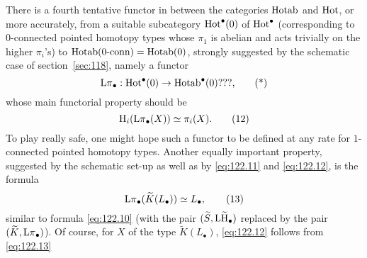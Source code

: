 There is a fourth tentative functor in between the categories
$\operatorname{Hotab}$ and $\operatorname{Hot}$, or more accurately, from a suitable
subcategory $\operatorname{Hot}^\bullet(0)$ of $\operatorname{Hot}^\bullet$ (corresponding to
$0$-connected pointed homotopy types whose $\pi_1$ is abelian and acts
trivially on the higher $\pi_i$'s) to $\operatorname{Hotab}(0\textup{-}\mathrm{conn})=\operatorname{Hotab}(0)$,
strongly suggested by the schematic case of section~\ref{sec:118},
namely a functor
\begin{equation}
  \label{eq:122.star}
  \operatorname{L\pi}_\bullet: \operatorname{Hot}^\bullet(0) \to \operatorname{Hotab}^\bullet(0)\text{???,}\tag{*}
\end{equation}
whose main functorial property should be
\begin{equation}
  \label{eq:122.12}
  \mathrm H_i(\operatorname{L\pi}_\bullet(X)) \simeq \pi_i(X).\tag{12}
\end{equation}
To play really safe, one might hope such a functor to be defined at
any rate for $1$-connected pointed homotopy types. Another equally
important property, suggested by the schematic set-up as well as by
\eqref{eq:122.11} and \eqref{eq:122.12}, is the formula
\begin{equation}
  \label{eq:122.13}
  \operatorname{L\pi}_\bullet(\widetilde K(L_\bullet)) \simeq L_\bullet,\tag{13}
\end{equation}
similar to formula \eqref{eq:122.10} (with the pair $(\widetilde
S,\operatorname{L\widetilde H}_\bullet)$ replaced by the pair $(\widetilde
K,\operatorname{L\pi}_\bullet)$). Of course, for $X$ of the type $\widetilde
K(L_\bullet)$, \eqref{eq:122.12} follows from \eqref{eq:122.13}

\bigbreak

\noindent\hfill{}\par

